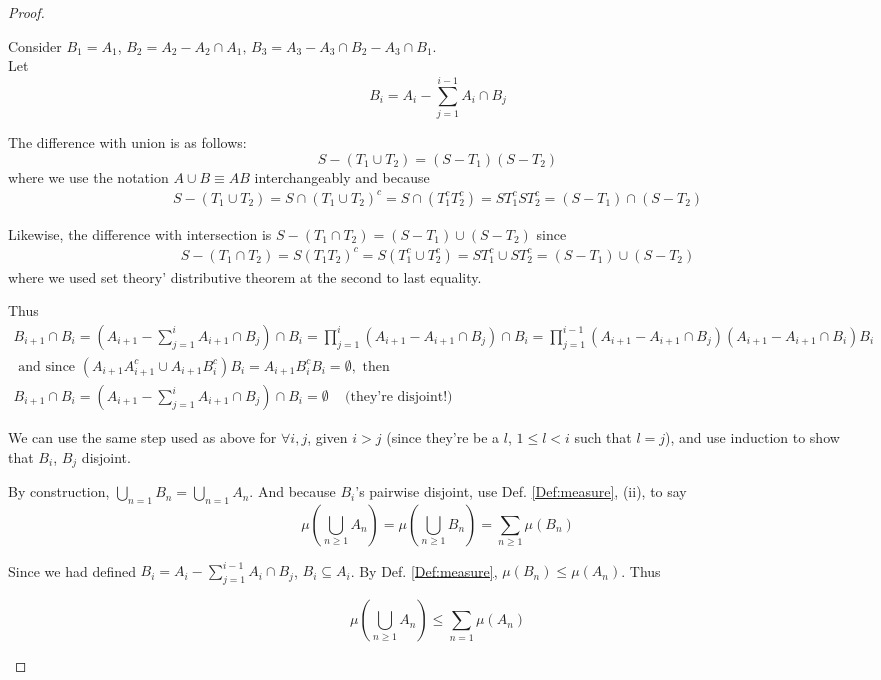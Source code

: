 \documentclass[10pt]{amsart}
\begin{document}
\begin{multicols*}{2}
\begin{proof}
\begin{enumerate}
	Consider $B_1 = A_1$, $B_2 = A_2 - A_2 \cap A_1, \, B_3 = A_3 - A_3 \cap B_2 - A_3 \cap B_1 $.\\
	
	Let 
	\[
	B_i = A_i - \sum_{j=1}^{i-1} A_i \cap B_j
	\]
	
	The difference with union is as follows:
	\[
	S - (T_1 \cup T_2) = (S-T_1) (S-T_2)
	\]
	where we use the notation $A \cup B \equiv AB$ interchangeably and because
	\[
	\begin{gathered}
		S-(T_1 \cup T_2) = S \cap (T_1 \cup T_2)^c = S \cap (T_1^c T_2^c) = ST_1^c ST_2^c = (S-T_1) \cap (S-T_2)
	\end{gathered}
	\]

Likewise, the difference with intersection is $S - (T_1 \cap T_2) = (S - T_1) \cup (S-T_2)$ since
\[
\begin{gathered}
S-(T_1 \cap T_2) = S (T_1T_2)^c = S (T_1^c \cup T_2^c) = ST_1^c \cup ST_2^c = (S - T_1) \cup (S -T_2)
\end{gathered}
\]
where we used set theory' distributive theorem at the second to last equality.
	
	Thus
	\[
	\begin{gathered}
		B_{i+1} \cap B_i = (A_{i+1} - \sum_{j=1}^i A_{i + 1} \cap B_j) \cap B_i = \prod_{j=1}^i (A_{i + 1} - A_{i+1} \cap B_j) \cap B_i = \prod_{j=1}^{i - 1} (A_{i + 1} - A_{i+1} \cap B_j) (A_{i+1} - A_{i + 1} \cap B_i) B_i \\
		\text{ and since } (A_{i+1} A_{i+1}^c \cup A_{i+1} B_i^c) B_i = A_{i+1}B_i^c B_i = \emptyset, \text{ then } \\
		B_{i+1} \cap B_i = (A_{i+1} - \sum_{j=1}^i A_{i + 1} \cap B_j) \cap B_i = \emptyset \quad \, \text{(they're disjoint!)}
	\end{gathered}
	\]
	
We can use the same step used as above for $\forall i, j$, given $i > j$ (since they're be a $l$, $1 \leq l < i$ such that $l = j$), and use induction to show that $B_i$, $B_j$ disjoint.	

By construction, $\bigcup_{n=1}B_n = \bigcup_{n=1} A_n$. And because $B_i$'s pairwise disjoint, use Def. \ref{Def:measure}, (ii), to say
\[
\mu(\bigcup_{n \geq 1} A_n) = \mu(\bigcup_{n \geq 1} B_n) = \sum_{n\geq 1} \mu(B_n)
\]

Since we had defined $B_i = A_i - \sum_{j=1}^{i-1} A_i \cap B_j$, $B_i \subseteq A_i$. By Def. \ref{Def:measure}, $\mu(B_n) \leq \mu(A_n)$. Thus

\[
\mu(\bigcup_{n \geq 1} A_n) \leq \sum_{n=1} \mu(A_n)
\]


\end{enumerate}
\end{proof}
\end{multicols*}
\end{document}
